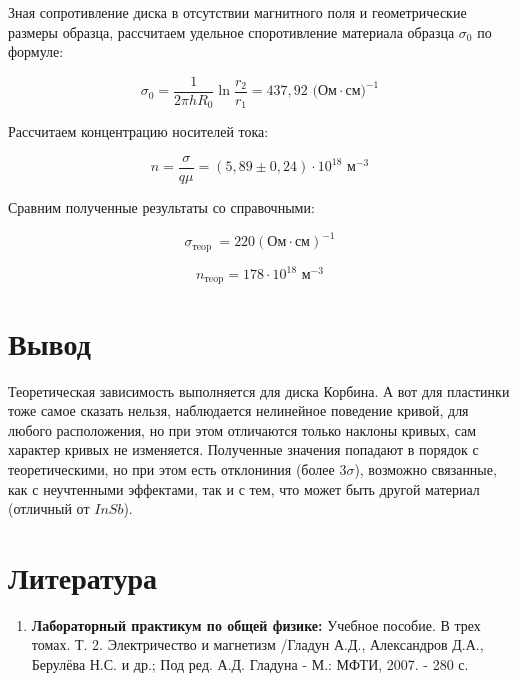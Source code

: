 \documentclass[a4paper, 12pt]{article}%
\begin{document}
Зная сопротивление диска в отсутствии магнитного поля и геометрические размеры образца, рассчитаем удельное споротивление материала образца $\sigma_0$ по формуле:

\[ \sigma_{0}=\frac{1}{2 \pi h R_{0}} \ln \frac{r_{2}}{r_{1}}= 437,92 \text{ (Ом} \cdot \text{см)}^{-1}\]

Рассчитаем концентрацию носителей тока:

\[ n=\frac{\sigma}{q \mu} = (5,89 \pm 0,24) \cdot 10^{18} \text{ м}^{-3} \]


Сравним полученные результаты со справочными:

\[ \sigma_{\text {тeop }}= 220 \left(\text{Ом} \cdot \text{см}\right)^{-1}\]

\[ n_{\text{тeop}}= 178 \cdot 10^{18} \text{ м}^{-3} \]

\section{Вывод}

Теоретическая зависимость выполняется для диска Корбина. А вот для пластинки тоже самое сказать нельзя, наблюдается нелинейное поведение кривой, для любого расположения, но при этом отличаются 
только наклоны кривых, сам характер кривых не изменяется. Полученные значения попадают в порядок с теоретическими, но при этом есть отклониния (более $3\sigma$), возможно связанные, как с неучтенными эффектами, так и с тем, что может быть другой материал (отличный от $InSb$).
\section{Литература}

\begin{enumerate}
\item \textbf{Лабораторный практикум по общей физике:} Учебное пособие. В трех томах. Т. 2. Электричество и магнетизм /Гладун А.Д., Александров Д.А., Берулёва Н.С. и др.; Под ред. А.Д. Гладуна - М.: МФТИ, 2007. - 280 с.

\end{enumerate}		
		
\end{document}
